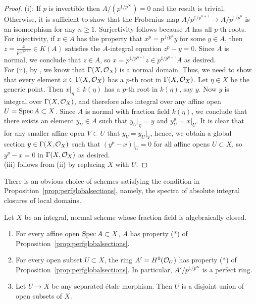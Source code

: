 \begin{proof}
(i): If $p$ is invertible then $A/(p^{1/p^{\infty}})=0$ and the result is trivial. Otherwise, it is sufficient to show that the Frobenius map $A/p^{1/p^{n+1}} \to A/p^{1/p^{n}}$ is an isomorphism 
for any $n\ge 1$. 
Surjectivity follows because $A$ has all $p$-th roots. For injectivity,
if $x \in A$ has the property that $x^p = p^{1/p^{n}}y$ for some $y \in A$, then $z=\frac{x}{p^{1/p^{n+1}}} \in K(A)$ satisfies the $A$-integral equation $z^p-y=0$.
Since $A$ is normal, we conclude that $z \in A$, so $x = p^{1/p^{n+1}}z \in p^{1/p^{n+1}}A$ as desired.\\
\indent For (ii), by \cite[0358]{sp}, we know that $\Gamma(X, \cal{O}_X)$ is a normal domain. Thus, we need to show that every element $x \in \Gamma(X, \cal{O}_X)$ has a $p$-th root in $\Gamma(X, \cal{O}_X)$. 
Let $\eta \in X$ be the generic point. Then $x|_{\eta} \in k(\eta)$ has a $p$-th root in $k(\eta)$, say $y$. Now $y$ is integral over $\Gamma(X, \cal{O}_X)$, and therefore also integral 
over any affine open $U=\spec{A} \subset X$.
Since $A$ is normal with fraction field $k(\eta)$, we conclude that there exists an element $y_U \in A$ such that $y_U|_{\eta} = y$ and $y_U^p = x|_U$. It is clear
that for any smaller affine open $V \subset U$ that $y_V = y_U|_V$, hence, we obtain a global section $y \in \Gamma(X, \cal{O}_X)$ such that $(y^p - x)|_U = 0$ for all 
affine opens $U \subset X$, so $y^p - x=0$ in $\Gamma(X, \cal{O}_X)$ as desired.\\
\indent (iii) follows from (ii) by replacing $X$ with $U$.
\end{proof}
There is an obvious choice of schemes satisfying the condition in Proposition~\ref{prop:perfglobalsections}, namely, the spectra of absolute integral closures of local domains.
\begin{proposition}\label{prop:flatcovermixed}
Let $X$ be an integral, normal scheme whose fraction field is algebraically closed.
\begin{enumerate}
\item[(i)] For every affine open $\spec{A} \subset X$, $A$ has property (*) of Proposition~\ref{prop:perfglobalsections}. 
\item[(ii)] For every open subset $U \subset X$, the ring $A'=H^0(\cal{O}_U)$ has property (*) of Proposition~\ref{prop:perfglobalsections}. In particular,
$A'/p^{1/p^{\infty}}$ is a perfect ring.
\item[(iii)] Let $U \to X$ be any separated \'{e}tale morphism. Then $U$ is a disjoint union of open subsets of $X$.
\end{enumerate}
\end{proposition}
